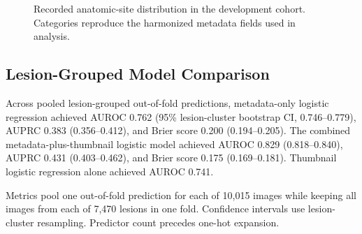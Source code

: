 \documentclass[11pt]{article}
\begin{document}
\begin{figure}[H]
\centering
{}
\caption{Recorded anatomic-site distribution in the development cohort. Categories reproduce the harmonized metadata fields used in analysis.}
\label{fig:site}
\end{figure}

\subsection{Lesion-Grouped Model Comparison}
Across pooled lesion-grouped out-of-fold predictions, metadata-only logistic regression achieved AUROC 0.762 (95\% lesion-cluster bootstrap CI, 0.746--0.779), AUPRC 0.383 (0.356--0.412), and Brier score 0.200 (0.194--0.205). The combined metadata-plus-thumbnail logistic model achieved AUROC 0.829 (0.818--0.840), AUPRC 0.431 (0.403--0.462), and Brier score 0.175 (0.169--0.181). Thumbnail logistic regression alone achieved AUROC 0.741.

\begin{table}[H]
\centering
\caption{Lesion-grouped out-of-fold comparison using a common logistic-regression pipeline.}
\label{tab:comparison}
\begin{threeparttable}
\scriptsize
{}
\begin{tablenotes}[flushleft]\footnotesize
\item Metrics pool one out-of-fold prediction for each of 10,015 images while keeping all images from each of 7,470 lesions in one fold. Confidence intervals use lesion-cluster resampling. Predictor count precedes one-hot expansion.
\end{tablenotes}
\end{threeparttable}
\end{table}
\end{document}
